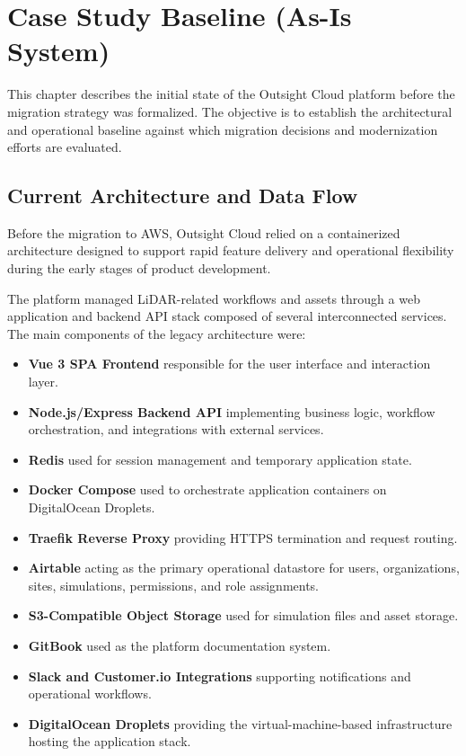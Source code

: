 \chapter{Case Study Baseline (As-Is System)}
\label{chap:baseline}

This chapter describes the initial state of the Outsight Cloud platform before the migration strategy was formalized. The objective is to establish the architectural and operational baseline against which migration decisions and modernization efforts are evaluated.

\section{Current Architecture and Data Flow}
Before the migration to AWS, Outsight Cloud relied on a containerized architecture designed to support rapid feature delivery and operational flexibility during the early stages of product development.

The platform managed LiDAR-related workflows and assets through a web application and backend API stack composed of several interconnected services. The main components of the legacy architecture were:

\begin{itemize}
    \item \textbf{Vue 3 SPA Frontend} responsible for the user interface and interaction layer.

    \item \textbf{Node.js/Express Backend API} implementing business logic, workflow orchestration, and integrations with external services.

    \item \textbf{Redis} used for session management and temporary application state.

    \item \textbf{Docker Compose} used to orchestrate application containers on DigitalOcean Droplets.

    \item \textbf{Traefik Reverse Proxy} providing HTTPS termination and request routing.

    \item \textbf{Airtable} acting as the primary operational datastore for users, organizations, sites, simulations, permissions, and role assignments.

    \item \textbf{S3-Compatible Object Storage} used for simulation files and asset storage.

    \item \textbf{GitBook} used as the platform documentation system.

    \item \textbf{Slack and Customer.io Integrations} supporting notifications and operational workflows.

    \item \textbf{DigitalOcean Droplets} providing the virtual-machine-based infrastructure hosting the application stack.
\end{itemize}

